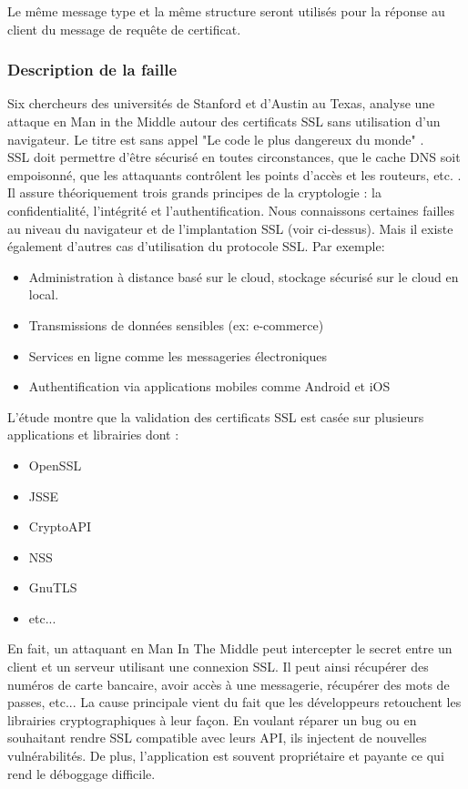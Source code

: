 Le même message type et la même structure seront utilisés pour la réponse au client du message de requête de certificat.


\subsubsection{Description de la faille}

Six chercheurs des universités de Stanford et d'Austin au Texas, analyse une attaque en Man in the Middle autour des certificats SSL sans utilisation d'un navigateur. Le titre est sans appel "Le code le plus dangereux du monde" \cite{validate2012martin}.\\


SSL doit permettre d'être sécurisé en toutes circonstances, que le cache DNS soit empoisonné, que les attaquants contrôlent les points d'accès et les routeurs, etc. . Il assure théoriquement trois grands principes de la cryptologie : la confidentialité, l'intégrité et l'authentification. Nous connaissons certaines failles au niveau du navigateur et de l'implantation SSL (voir ci-dessus). Mais il existe également d'autres cas d'utilisation du protocole SSL. Par exemple:
\begin{itemize}
\item Administration à distance basé sur le cloud, stockage sécurisé sur le cloud en local.
\item Transmissions de données sensibles (ex: e-commerce)
\item Services en ligne comme les messageries électroniques
\item Authentification via applications mobiles comme Android et iOS\\
\end{itemize}

L'étude montre que la validation des certificats SSL est casée sur plusieurs applications et librairies dont :
\begin{itemize}
\item OpenSSL
\item JSSE
\item CryptoAPI
\item NSS
\item GnuTLS
\item etc...\\
\end{itemize}

En fait, un attaquant en Man In The Middle peut intercepter le secret entre un client et un serveur utilisant une connexion SSL. Il peut ainsi récupérer des numéros de carte bancaire, avoir accès à une messagerie, récupérer des mots de passes, etc... La cause principale vient du fait que les développeurs retouchent les librairies cryptographiques à leur façon. En voulant réparer un bug ou en souhaitant rendre SSL compatible avec leurs API, ils injectent de nouvelles vulnérabilités. De plus, l'application est souvent propriétaire et payante ce qui rend le déboggage difficile.\\


